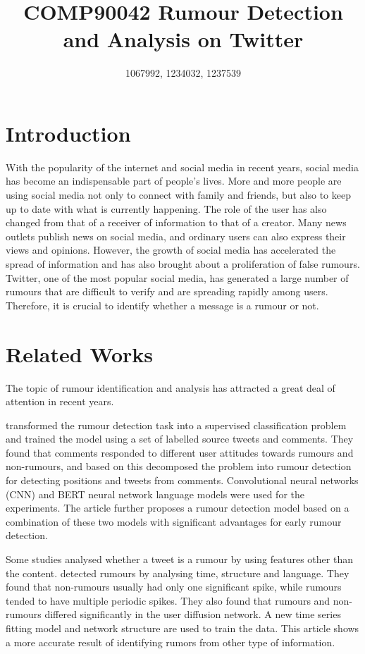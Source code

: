 \documentclass[11pt, a4paper]{article}
\title{COMP90042 Rumour Detection and Analysis on Twitter}
\author{1067992, 1234032, 1237539}
\begin{document}
\maketitle

\section{Introduction}

With the popularity of the internet and social media in recent years, social media has become an indispensable part of people's lives. More and more people are using social media not only to connect with family and friends, but also to keep up to date with what is currently happening. The role of the user has also changed from that of a receiver of information to that of a creator. Many news outlets publish news on social media, and ordinary users can also express their views and opinions. However, the growth of social media has accelerated the spread of information and has also brought about a proliferation of false rumours. Twitter, one of the most popular social media, has generated a large number of rumours that are difficult to verify and are spreading rapidly among users. Therefore, it is crucial to identify whether a message is a rumour or not.

\section{Related Works}

The topic of rumour identification and analysis has attracted a great deal of attention in recent years. 

\citet{tian20202} transformed the rumour detection task into a supervised classification problem and trained the model using a set of labelled source tweets and comments. They found that comments responded to different user attitudes towards rumours and non-rumours, and based on this decomposed the problem into rumour detection for detecting positions and tweets from comments. Convolutional neural networks (CNN) and BERT neural network language models were used for the experiments. The article further proposes a rumour detection model based on a combination of these two models with significant advantages for early rumour detection.

Some studies analysed whether a tweet is a rumour by using features other than the content. \citet{kwon20132} detected rumours by analysing time, structure and language. They found that non-rumours usually had only one significant spike, while rumours tended to have multiple periodic spikes. They also found that rumours and non-rumours differed significantly in the user diffusion network. A new time series fitting model and network structure are used to train the data. This article shows a more accurate result of identifying rumors from other type of information.
\end{document}
